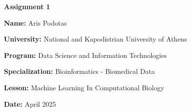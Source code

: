 \documentclass[12pt, a4paper]{article}
\author{Aris Podotas}
\date{today}
\begin{document}
\begin{titlepage}
    \centering
    {\huge \textbf{Assignment 1}\par}
    \vspace{0.5cm}
    {\Large \textbf{Name:} Aris Podotas\par}
    \vspace{0.5cm}
    {\large \textbf{University:} National and Kapodistrian University of Athens\par}
    \vspace{0.5cm}
    {\large \textbf{Program:} Data Science and Information Technologies\par}
    \vspace{0.5cm}
    {\large \textbf{Specialization:} Bioinformatics - Biomedical Data\par}
    \vspace{0.5cm}
    {\large \textbf{Lesson:} Machine Learning In Computational Biology\par}
    \vspace{0.5cm}
    {\large \textbf{Date:} April 2025\par}
    \tableofcontents
\end{titlepage}
\end{document}
